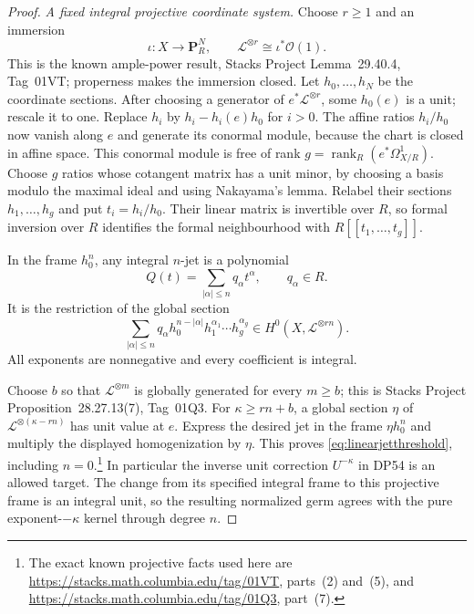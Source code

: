 \begin{proof}
\emph{A fixed integral projective coordinate system.}
Choose $r\ge1$ and an immersion
\[
 \iota:X\longrightarrow\mathbf P^N_R,
 \qquad \mathcal L^{\otimes r}\cong\iota^*\mathcal O(1).
\]
This is the known ample-power result, Stacks Project Lemma~29.40.4, Tag~01VT; properness makes the immersion closed.
Let $h_0,\ldots,h_N$ be the coordinate sections.
After choosing a generator of $e^*\mathcal L^{\otimes r}$, some $h_0(e)$ is a unit; rescale it to one.
Replace $h_i$ by $h_i-h_i(e)h_0$ for $i>0$.
The affine ratios $h_i/h_0$ now vanish along $e$ and generate its conormal module, because the chart is closed in affine space.
This conormal module is free of rank $g=\operatorname{rank}_R(e^*\Omega^1_{X/R})$.
Choose $g$ ratios whose cotangent matrix has a unit minor, by choosing a basis modulo the maximal ideal and using Nakayama's lemma.
Relabel their sections $h_1,\ldots,h_g$ and put $t_i=h_i/h_0$.
Their linear matrix is invertible over $R$, so formal inversion over $R$ identifies the formal neighbourhood with $R[[t_1,\ldots,t_g]]$.

In the frame $h_0^n$, any integral $n$-jet is a polynomial
\[
 Q(t)=\sum_{|\alpha|\le n}q_\alpha t^\alpha,
 \qquad q_\alpha\in R.
\]
It is the restriction of the global section
\[
 \sum_{|\alpha|\le n}q_\alpha
 h_0^{n-|\alpha|}h_1^{\alpha_1}\cdots h_g^{\alpha_g}
 \in H^0(X,\mathcal L^{\otimes rn}).
\]
All exponents are nonnegative and every coefficient is integral.

Choose $b$ so that $\mathcal L^{\otimes m}$ is globally generated for every $m\ge b$; this is Stacks Project Proposition~28.27.13(7), Tag~01Q3.
For $\kappa\ge rn+b$, a global section $\eta$ of $\mathcal L^{\otimes(\kappa-rn)}$ has unit value at $e$.
Express the desired jet in the frame $\eta h_0^n$ and multiply the displayed homogenization by $\eta$.
This proves \eqref{eq:linearjetthreshold}, including $n=0$.\footnote{The exact known projective facts used here are \url{https://stacks.math.columbia.edu/tag/01VT}, parts~(2) and~(5), and \url{https://stacks.math.columbia.edu/tag/01Q3}, part~(7).}
In particular the inverse unit correction $U^{-\kappa}$ in DP54 is an allowed target. The change from its specified integral frame to this projective frame is an integral unit, so the resulting normalized germ agrees with the pure exponent-$-\kappa$ kernel through degree $n$.


\end{proof}
